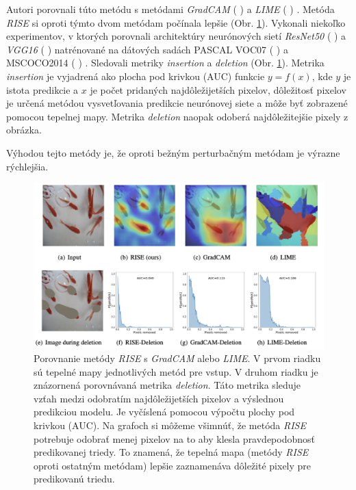 Autori porovnali túto metódu s metódami \textit{GradCAM} (\citeauthor*{selvaraju2017grad} \citeyear{selvaraju2017grad}) \cite{selvaraju2017grad} a \textit{LIME} (\citeauthor*{ribeiro2016should} \citeyear{ribeiro2016should}) \cite{ribeiro2016should}. Metóda \textit{RISE} si oproti týmto dvom metódam počínala lepšie (Obr. \ref{fig:rise_results}). Vykonali niekoľko experimentov, v ktorých porovnali architektúry neurónových sietí \textit{ResNet50} (\citeauthor*{he2016deep} \citeyear{he2016deep}) \cite{he2016deep} a \textit{VGG16} (\citeauthor{simonyan2014very} \citeyear{simonyan2014very}) \cite{simonyan2014very} natrénované na dátových sadách PASCAL VOC07 (\citeauthor*{everingham2010pascal} \citeyear{everingham2010pascal}) \cite{everingham2010pascal} a MSCOCO2014 (\citeauthor*{lin2014microsoft} \citeyear{lin2014microsoft}) \cite{lin2014microsoft}. Sledovali metriky \textit{insertion} a \textit{deletion} (Obr. \ref{fig:rise_results}). Metrika \textit{insertion} je vyjadrená ako plocha pod krivkou (AUC) funkcie $y = f(x)$, kde $y$ je istota predikcie a $x$ je počet pridaných najdôležijetších pixelov, dôležitosť pixelov je určená metódou vysvetľovania predikcie neurónovej siete a môže byť zobrazené pomocou tepelnej mapy. Metrika \textit{deletion} naopak odoberá najdôležitejšie pixely z obrázka.

Výhodou tejto metódy je, že oproti bežným perturbačným metódam je výrazne rýchlejšia.

\begin{figure}[h!]
    \centering
    \includegraphics[scale=0.5]{assets/images/rise_results.png}
    \caption{Porovnanie metódy \textit{RISE} s \textit{GradCAM} alebo \textit{LIME}. \cite{petsiuk2018rise} V prvom riadku sú tepelné mapy jednotlivých metód pre vstup. V druhom riadku je znázornená porovnávaná metrika \textit{deletion}. Táto metrika sleduje vzťah medzi odobratím najdôležijetších pixelov a výslednou predikciou modelu. Je vyčíslená pomocou výpočtu plochy pod krivkou (AUC). Na grafoch si môžeme všimnúť, že metóda \textit{RISE} potrebuje odobrať menej pixelov na to aby klesla pravdepodobnosť predikovanej triedy. To znamená, že tepelná mapa (metódy \textit{RISE} oproti ostatným metódam) lepšie zaznamenáva dôležité pixely pre predikovanú triedu.}
    \label{fig:rise_results}
\end{figure}

